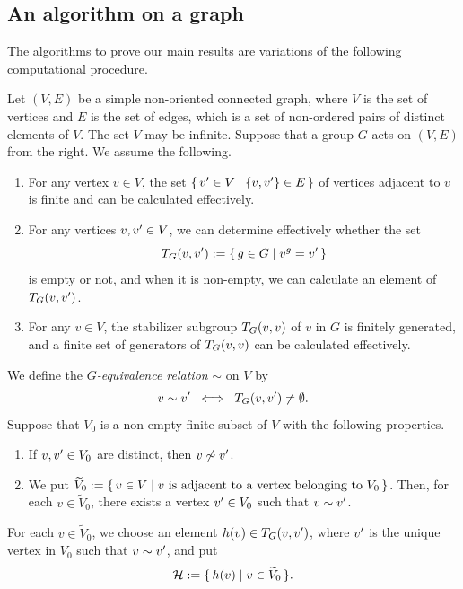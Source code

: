 \documentclass{amsart}
\numberwithin{procedure}{section}
\begin{document}
\subsection{An algorithm on a graph}\label{subsec:graph}
%
The algorithms to prove our main results are variations of 
the following computational procedure.
\par
Let $(V, E)$ be a simple non-oriented connected graph,
where $V$ is the set of vertices
and $E$ is the set of edges,
which is a set of non-ordered pairs of distinct elements of $V$.
The set  $V$ may be  infinite.
Suppose that a group $G$ acts on $(V, E)$ from the right.
We assume the following.
%
\newcommand{\AssumpVE}{$\mathord{\rm VE}$}
\begin{enumerate}[(\AssumpVE-1)]
\item
For any vertex $v\in V$,
the set $\{\,{v\sp\prime \in V}\mid {\{v, v\sp\prime\}\in E} \,\}$
of vertices adjacent to $v$ is finite and can be calculated
effectively.
\item
For any vertices $v, v\sp\prime\in V$, we can determine effectively
whether the set
%
\begin{equation}\label{eq:TG}
T_G (v, v\sp\prime):=\{\,{g\in G}\mid {v^g=v\sp\prime} \,\}
\end{equation}
%
is empty or not,
and when it is non-empty,
we can calculate an element of $T_G (v, v\sp\prime)$.
\item
For any  $v\in V$,
the stabilizer subgroup $T_G (v, v)$ of $v$ in $G$
is finitely generated, and a finite set of generators of $T_G (v, v)$
can be calculated
effectively.
\end{enumerate}
%
We define the \emph{$G$-equivalence relation} $\sim$ on $V$ by
\[
v\sim v\sp\prime\;\;\Longleftrightarrow\;\; T_G (v, v\sp\prime)\ne\emptyset.
 \]
Suppose that $V_0$ is
a non-empty finite subset of $V$ with the following properties.
%
%
\newcommand{\PropertyVzero}{$\mathord{\rm V}_0$}
\begin{enumerate}[(\PropertyVzero-1)]
\item If $v, v\sp\prime \in V_0$ are distinct,
then $v\not\sim v\sp\prime$.
\item
We put
$\widetilde{V}_0:=\{\,{v\in V}\mid { \textrm{$v$ is adjacent to a vertex belonging to $V_0$}} \,\}$.
Then, for each  $v\in \widetilde{V}_0$,
there exists a vertex $v\sp\prime\in V_0$ such that  $v\sim v\sp\prime$.
\end{enumerate}
%
For each $v\in \widetilde{V}_0$,
we choose an element
$h(v)\in T_G (v, v\sp\prime)$,
where $v\sp\prime$ is
the unique vertex in $V_0$ such that  $v\sim v\sp\prime$,
and put
\[
\mathord{\mathcal H}:=\{\,{h(v)}\mid {v\in \widetilde{V}_0} \,\}.
\]
\end{document}
